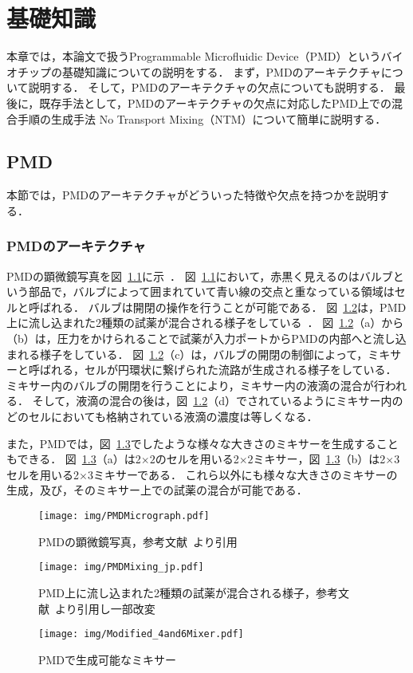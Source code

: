 \chapter{基礎知識}
本章では，本論文で扱うProgrammable Microfluidic Device（PMD）というバイオチップの基礎知識についての説明をする．
まず，PMDのアーキテクチャについて説明する．
そして，PMDのアーキテクチャの欠点についても説明する．
最後に，既存手法として，PMDのアーキテクチャの欠点に対応したPMD上での混合手順の生成手法
No Transport Mixing（NTM）について簡単に説明する．
\section{PMD}
\label{PMD}
本節では，PMDのアーキテクチャがどういった特徴や欠点を持つかを説明する．
\subsection{PMDのアーキテクチャ}
\label{arc}
PMDの顕微鏡写真を図~\ref{fig:micrograph}に示~\cite{1}．
図~\ref{fig:micrograph}において，赤黒く見えるのはバルブという部品で，バルブによって囲まれていて青い線の交点と重なっている領域はセルと呼ばれる．
バルブは開閉の操作を行うことが可能である．
図~\ref{fig:mixing}は，PMD上に流し込まれた2種類の試薬が混合される様子をしている~\cite{4}．
図~\ref{fig:mixing}（a）から（b）は，圧力をかけられることで試薬が入力ポートからPMDの内部へと流し込まれる様子をしている．
図~\ref{fig:mixing}（c）は，バルブの開閉の制御によって，ミキサーと呼ばれる，セルが円環状に繋げられた流路が生成される様子をしている．
ミキサー内のバルブの開閉を行うことにより，ミキサー内の液滴の混合が行われる．
そして，液滴の混合の後は，図~\ref{fig:mixing}（d）でされているようにミキサー内のどのセルにおいても格納されている液滴の濃度は等しくなる．

また，PMDでは，図~\ref{fig:4and6Mixer}でしたような様々な大きさのミキサーを生成することもできる．
図~\ref{fig:4and6Mixer}（a）は2$\times2$のセルを用いる2$\times2$ミキサー，図~\ref{fig:4and6Mixer}（b）は2$\times$3セルを用いる2$\times$3ミキサーである．
これら以外にも様々な大きさのミキサーの生成，及び，そのミキサー上での試薬の混合が可能である．
\begin{figure}[tbp]
 \centering\texttt{[image: img/PMDMicrograph.pdf]}
 \caption{PMDの顕微鏡写真，参考文献~\cite{1}より引用}\label{fig:micrograph}
\end{figure}
\begin{figure}[tbp]
 \centering\texttt{[image: img/PMDMixing\_jp.pdf]}
    \caption{PMD上に流し込まれた2種類の試薬が混合される様子，参考文献~\cite{4}より引用し一部改変}\label{fig:mixing}
\end{figure}
\begin{figure}[tbp]
    \centering\texttt{[image: img/Modified\_4and6Mixer.pdf]}
 \caption{PMDで生成可能なミキサー}\label{fig:4and6Mixer}
\end{figure}
\newpage
